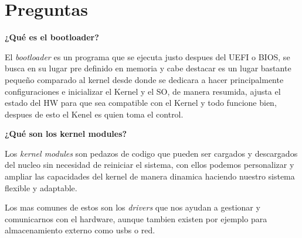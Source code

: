 \section*{Preguntas}
\textbf{¿Qué es el bootloader?}\vspace{.2cm}

El \textit{bootloader} es un programa que se ejecuta justo despues del UEFI o BIOS, se busca en su lugar pre definido en memoria y cabe destacar es un lugar bastante pequeño comparado al kernel desde donde se dedicara a hacer principalmente configuraciones e inicializar el Kernel y el SO, de manera resumida, ajusta el estado del HW para que sea compatible con el Kernel y todo funcione bien, despues de esto el Kenel es quien toma el control. \vspace{.3cm}

\textbf{¿Qué son los kernel modules?}\vspace{.2cm}

Los \textit{kernel modules} son pedazos de codigo que pueden ser cargados y descargados del nucleo sin necesidad de reiniciar el sistema, con ellos podemos personalizar y ampliar las capacidades del kernel de manera dinamica haciendo nuestro sistema flexible y adaptable. \vspace{.2cm}

Los mas comunes de estos son los \textit{drivers} que nos ayudan a gestionar y comunicarnos con el hardware, aunque tambien existen por ejemplo para almacenamiento externo como usbs o red.    